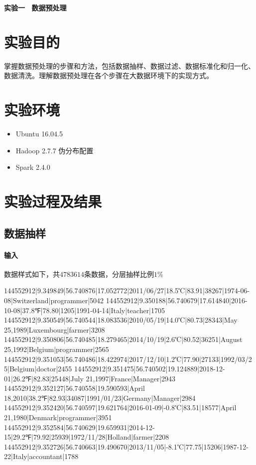 \documentclass{ML}
\begin{document}
\maketitle

\tableofcontents
\newpage

\begin{center}
    \textbf{ 实验一 \  数据预处理}
\end{center}

\section{实验目的}
掌握数据预处理的步骤和方法，包括数据抽样、数据过滤、数据标准化和归一化、数据清洗。理解数据预处理在各个步骤在大数据环境下的实现方式。

\section{实验环境}
\begin{itemize}
    \item Ubuntu 16.04.5
    \item Hadoop 2.7.7 伪分布配置
    \item Spark 2.4.0
\end{itemize}
\section{实验过程及结果}
\subsection{数据抽样}
\paragraph{输入}数据样式如下，共$4783614$条数据，分层抽样比例$1\%$
\begin{textcode}
144552912|9.349849|56.740876|17.052772|2011/06/27|18.5℃|83.91|38267|1974-06-08|Switzerland|programmer|5042
144552912|9.350188|56.740679|17.614840|2016-10-08|37.8℉|78.80|1205|1991-04-14|Italy|teacher|1705
144552912|9.350549|56.740544|18.083536|2010/05/19|14.0℃|80.73|28343|May 25,1989|Luxembourg|farmer|3208
144552912|9.350806|56.740485|18.279465|2014/10/19|2.6℃|80.52|36251|August 25,1992|Belgium|programmer|2565
144552912|9.351053|56.740486|18.422974|2017/12/10|1.2℃|77.90|27133|1992/03/25|Belgium|doctor|2455
144552912|9.351475|56.740502|19.124889|2018-12-01|26.2℉|82.83|25448|July 21,1997|France|Manager|2943
144552912|9.352127|56.740558|19.590593|April 18,2010|38.2℉|82.93|34087|1991/01/23|Germany|Manager|2984
144552912|9.352420|56.740597|19.621764|2016-01-09|-0.8℃|83.51|18577|April 21,1980|Denmark|programmer|3951
144552912|9.352584|56.740629|19.659931|2014-12-15|29.2℉|79.92|25939|1972/11/28|Holland|farmer|2208
144552912|9.352726|56.740663|19.490670|2013/11/05|-8.1℃|77.75|15206|1987-12-22|Italy|accountant|1788
\end{textcode}
\end{document}
